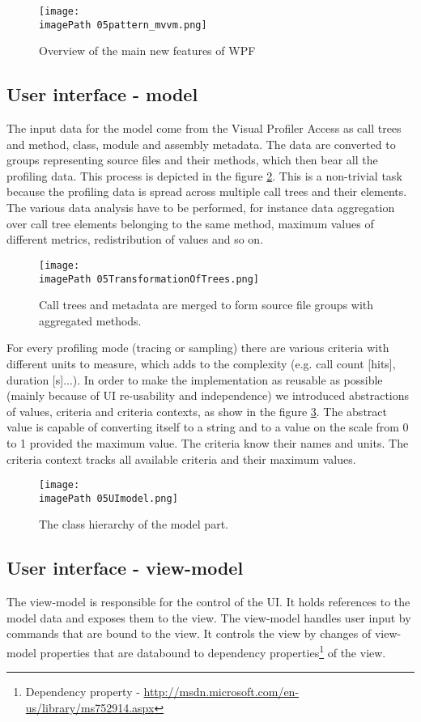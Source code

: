 \begin{figure}
	\centering
		\texttt{[image: \\imagePath 05pattern\_mvvm.png]}
		\caption{Overview of the main new features of WPF \cite{WPFpage}}
	\label{fig:05pattern_mvvm}
\end{figure}

\subsection{User interface - model}
The input data for the model come from the Visual Profiler Access as call trees and method, class, module and assembly metadata. The data are converted to groups representing source files and their methods, which then bear all the profiling data. This process is depicted in the figure \ref{fig:05TransformationOfTrees}. This is a non-trivial task because the profiling data is spread across multiple call trees and their elements. The various data analysis have to be performed, for instance data aggregation over call tree elements belonging to the same method, maximum values of different metrics, redistribution of values and so on.

 \begin{figure}
	\centering
		\texttt{[image: \\imagePath 05TransformationOfTrees.png]}
		\caption{Call trees and metadata are merged to form source file groups with aggregated methods.}
	\label{fig:05TransformationOfTrees}
\end{figure}

For every profiling mode (tracing or sampling) there are various criteria with different units to measure, which adds to the complexity (e.g. call count [hits], duration [s]...). In order to make the implementation as reusable as possible (mainly because of UI re-usability and independence) we introduced abstractions of values, criteria and criteria contexts, as show in the figure \ref{fig:05UImodel}. The abstract value is capable of converting itself to a string and to a value on the scale from 0 to 1 provided the maximum value. The criteria know their names and units. The criteria context tracks all available criteria and their maximum values. 

 \begin{figure}
	\centering
		\texttt{[image: \\imagePath 05UImodel.png]}
		\caption{The class hierarchy of the model part.}
	\label{fig:05UImodel}
\end{figure}

\subsection{User interface - view-model}
The view-model is responsible for the control of the UI. It holds references to the model data and exposes them to the view. The view-model handles user input by commands that are bound to the view. It controls the view by changes of view-model properties that are databound to dependency properties\footnote{Dependency property - \href{http://msdn.microsoft.com/en-us/library/ms752914.aspx}{http://msdn.microsoft.com/en-us/library/ms752914.aspx}} of the view.

